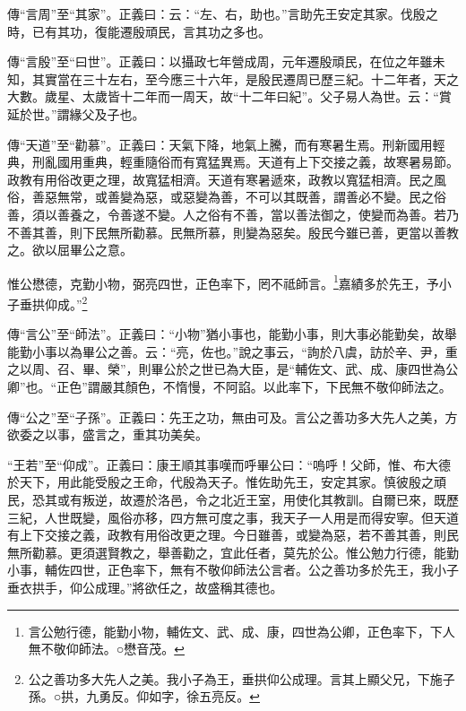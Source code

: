 {\noindent\zhuan{}\fzbyks 傳“言周”至“其家”。正義曰：云：“左、右，助也。”言助先王安定其家。伐殷之時，已有其功，復能遷殷頑民，言其功之多也。 \par}

{\noindent\zhuan{}\fzbyks 傳“言殷”至“曰世”。正義曰：以攝政七年營成周，元年遷殷頑民，在位之年雖未知，其實當在三十左右，至今應三十六年，是殷民遷周已歷三紀。十二年者，天之大數。歲星、太歲皆十二年而一周天，故“十二年曰紀”。父子易人為世。云：“賞延於世。”謂緣父及子也。 \par}

{\noindent\zhuan{}\fzbyks 傳“天道”至“勸慕”。正義曰：天氣下降，地氣上騰，而有寒暑生焉。刑新國用輕典，刑亂國用重典，輕重隨俗而有寬猛異焉。天道有上下交接之義，故寒暑易節。政教有用俗改更之理，故寬猛相濟。天道有寒暑遞來，政教以寬猛相濟。民之風俗，善惡無常，或善變為惡，或惡變為善，不可以其既善，謂善必不變。民之俗善，須以善養之，令善遂不變。人之俗有不善，當以善法御之，使變而為善。若乃不善其善，則下民無所勸慕。民無所慕，則變為惡矣。殷民今雖已善，更當以善教之。欲以屈畢公之意。 \par}

惟公懋德，克勤小物，弼亮四世，正色率下，罔不祗師言。\footnote{言公勉行德，能勤小物，輔佐文、武、成、康，四世為公卿，正色率下，下人無不敬仰師法。○懋音茂。}嘉績多於先王，予小子垂拱仰成。”\footnote{公之善功多大先人之美。我小子為王，垂拱仰公成理。言其上顯父兄，下施子孫。○拱，九勇反。仰如字，徐五亮反。}

{\noindent\zhuan{}\fzbyks 傳“言公”至“師法”。正義曰：“小物”猶小事也，能勤小事，則大事必能勤矣，故舉能勤小事以為畢公之善。云：“亮，佐也。”說之事云，“詢於八虞，訪於辛、尹，重之以周、召、畢、榮”，則畢公於之世已為大臣，是“輔佐文、武、成、康四世為公卿”也。“正色”謂嚴其顏色，不惰慢，不阿諂。以此率下，下民無不敬仰師法之。 \par}

{\noindent\zhuan{}\fzbyks 傳“公之”至“子孫”。正義曰：先王之功，無由可及。言公之善功多大先人之美，方欲委之以事，盛言之，重其功美矣。 \par}

{\noindent\shu{}\fzkt “王若”至“仰成”。正義曰：康王順其事嘆而呼畢公曰：“嗚呼！父師，惟、布大德於天下，用此能受殷之王命，代殷為天子。惟佐助先王，安定其家。慎彼殷之頑民，恐其或有叛逆，故遷於洛邑，令之北近王室，用使化其教訓。自爾已來，既歷三紀，人世既變，風俗亦移，四方無可度之事，我天子一人用是而得安寧。但天道有上下交接之義，政教有用俗改更之理。今日雖善，或變為惡，若不善其善，則民無所勸慕。更須選賢教之，舉善勸之，宜此任者，莫先於公。惟公勉力行德，能勤小事，輔佐四世，正色率下，無有不敬仰師法公言者。公之善功多於先王，我小子垂衣拱手，仰公成理。”將欲任之，故盛稱其德也。 \par}

